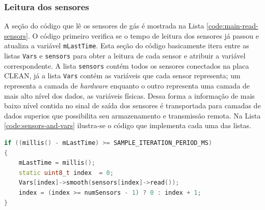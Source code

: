 \subsubsection{Leitura dos sensores}

A seção do código que lê os sensores de gás é mostrada na Lista \ref{code:main-read-sensors}. O código primeiro verifica se o tempo de leitura dos sensores já passou e atualiza a variável \texttt{mLastTime}. Esta seção do código basicamente itera entre as listas \texttt{Vars} e \texttt{sensors} para obter a leitura de cada sensor e atribuir a variável correspondente. A lista \texttt{sensors} contém todos os sensores conectados na placa CLEAN, já a lista \texttt{Vars} contém as variáveis que cada sensor representa; um representa a camada de \textit{hardware} enquanto o outro representa uma camada de mais alto nível dos dados, as variáveis físicas. Dessa forma a informação de mais baixo nível contida no sinal de saída dos sensores é transportada para camadas de dados superios que possibilita seu armazenamento e transmissão remota. Na Lista \ref{code:sensors-and-vars} ilustra-se o código que implementa cada uma das listas.

\begin{lstlisting}[language=C++, caption=Código para leitura dos sensores]
if ((millis() - mLastTime) >= SAMPLE_ITERATION_PERIOD_MS)
{
    mLastTime = millis();
    static uint8_t index  = 0;
    Vars[index]->smooth(sensors[index]->read());
    index = (index >= numSensors - 1) ? 0 : index + 1;
}
\end{lstlisting}
\label{code:main-read-sensors}

